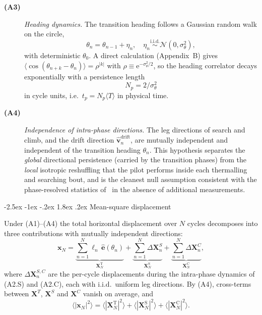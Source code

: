 \documentclass[11pt,a4paper]{article}
\makeatletter
\renewcommand\section{\@startsection{section}{1}{\z@}%
  {-2.5ex \@plus -1ex \@minus -.2ex}%
  {1.8ex \@plus.2ex}%
  {\normalfont\normalsize\bfseries\centering}}
\makeatother
\begin{document}
\begin{description}
\item[\textbf{(A3)}] \emph{Heading dynamics.} The transition heading
follows a Gaussian random walk on the circle,
\begin{equation}
\theta_n = \theta_{n-1} + \eta_n, \quad
\eta_n \overset{\mathrm{i.i.d.}}{\sim} \mathcal{N}(0, \sigma_\theta^2),
\label{eq:heading}
\end{equation}
with deterministic $\theta_0$. A direct calculation
(Appendix~B) gives
$\langle \cos(\theta_{n+k} - \theta_n)\rangle = \rho^{|k|}$ with
$\rho \equiv \mathrm{e}^{-\sigma_\theta^2/2}$, so the heading
correlator decays exponentially with a persistence length
\begin{equation}
N_p = 2/\sigma_\theta^2
\label{eq:Np}
\end{equation}
in cycle units, i.e.\ $t_p = N_p\langle T\rangle$ in physical time.

\item[\textbf{(A4)}] \emph{Independence of intra-phase directions.}
The leg directions of search and climb, and the drift direction
$\hat{\mathbf{v}}_n^{\mathrm{drift}}$, are mutually independent and
independent of the transition heading $\theta_n$. This hypothesis
separates the \emph{global} directional persistence (carried by the
transition phases) from the \emph{local} isotropic reshuffling that
the pilot performs inside each thermalling and searching bout, and
is the cleanest null assumption consistent with the phase-resolved
statistics of~\cite{vilpellet2026} in the absence of additional
measurements.
\end{description}

\section{Mean-square displacement}
\label{sec:msd}

Under (A1)--(A4) the total horizontal displacement over $N$ cycles
decomposes into three contributions with mutually independent
directions:
\begin{equation}
\mathbf{x}_N
 = \underbrace{\sum_{n=1}^N \ell_n\,\hat{\mathbf{e}}(\theta_n)}_{\mathbf{X}_N^{\mathrm{T}}}
 + \underbrace{\sum_{n=1}^N \Delta\mathbf{X}_n^S}_{\mathbf{X}_N^{\mathrm{S}}}
 + \underbrace{\sum_{n=1}^N \Delta\mathbf{X}_n^C}_{\mathbf{X}_N^{\mathrm{C}}},
\label{eq:xN-decomp}
\end{equation}
where $\Delta\mathbf{X}_n^{S,C}$ are the per-cycle displacements
during the intra-phase dynamics of (A2.S) and (A2.C), each with
i.i.d.\ uniform leg directions. By (A4), cross-terms between
$\mathbf{X}^{T}$, $\mathbf{X}^{S}$ and $\mathbf{X}^{C}$ vanish on
average, and
\begin{equation}
\langle |\mathbf{x}_N|^2 \rangle
 = \langle |\mathbf{X}_N^{\mathrm{T}}|^2 \rangle
 + \langle |\mathbf{X}_N^{\mathrm{S}}|^2 \rangle
 + \langle |\mathbf{X}_N^{\mathrm{C}}|^2 \rangle.
\label{eq:msd-sum}
\end{equation}
\end{document}

